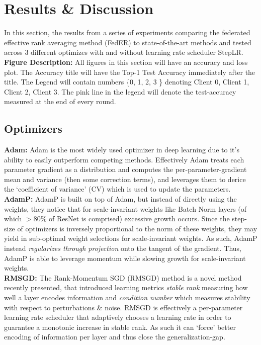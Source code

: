 \chapter{Results \& Discussion}
In this section, the results from a series of experiments comparing the federated effective rank averaging method (FedER) to state-of-the-art methods and tested across 3 different optimizes with and without learning rate scheduler StepLR. \\

\textbf{Figure Description: }All figures in this section will have an accuracy and loss plot. The Accuracy title will have the Top-1 Test Accuracy immediately after the title. The Legend will contain numbers \{0, 1, 2, 3 \} denoting Client 0, Client 1, Client 2, Client 3. The pink line in the legend will denote the test-accuracy measured at the end of every round. 

\section{Optimizers}\label{sec:optimizers}
\textbf{Adam:} Adam \cite{kingma2014adam} is the most widely used optimizer in deep learning due to it's ability to easily outperform competing methods. Effectively Adam treats each parameter gradient as a distribution and computes the per-parameter-gradient mean and variance (then some correction terms), and leverages them to derice the  `coefficient of variance' (CV) which is used to update the parameters.\\

\textbf{AdamP:} AdamP \cite{heo2020adamp} is built on top of Adam, but instead of directly using the weights, they notice that for scale-invariant weights like Batch Norm layers (of which $>$80\% of ResNet is comprised) excessive growth occurs. Since the step-size of optimizers is inversely proportional to the norm of these weights, they may yield in sub-optimal weight selections for scale-invariant weights. As such, AdamP instead \textit{regularizes through projection} onto the tangent of the gradient. Thus, AdamP is able to leverage momentum while slowing growth for scale-invariant weights.\\

\textbf{RMSGD:} The Rank-Momentum SGD (RMSGD) method \cite{hosseini2022exploiting} is a novel method recently presented, that introduced learning metrics \textit{stable rank} measuring how well a layer encodes information and \textit{condition number} which measures stability with respect to perturbations \& noise. RMSGD is effectively a per-parameter learning rate scheduler that adaptively chooses a learning rate in order to guarantee a monotonic increase in stable rank. As such it can `force' better encoding of information per layer and thus close the generalization-gap.\\

